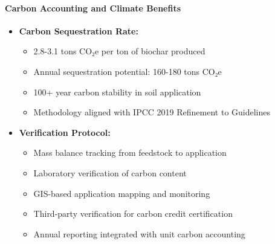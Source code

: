 \paragraph{Carbon Accounting and Climate Benefits}
\label{sec:biochar_carbon_capture}
\begin{itemize}
    \item \textbf{Carbon Sequestration Rate:}
    \begin{itemize}
        \item 2.8-3.1 tons CO₂e per ton of biochar produced
        \item Annual sequestration potential: 160-180 tons CO₂e
        \item 100+ year carbon stability in soil application
        \item Methodology aligned with IPCC 2019 Refinement to Guidelines
    \end{itemize}
    
    \item \textbf{Verification Protocol:}
    \begin{itemize}
        \item Mass balance tracking from feedstock to application
        \item Laboratory verification of carbon content
        \item GIS-based application mapping and monitoring
        \item Third-party verification for carbon credit certification
        \item Annual reporting integrated with unit carbon accounting
    \end{itemize}
\end{itemize}

